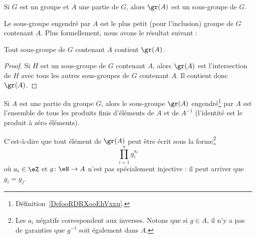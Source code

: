 \begin{lemma}
	Si \( G\) est un groupe et \( A\) une partie de \( G\), alors \( \gr(A)\) est un sous-groupe de \( G\).
\end{lemma}

Le sous-groupe engendré par \( A \) est le plus petit (pour l'inclusion) groupe de \( G\) contenant \( A\). Plus formellement, nous avons le résultat suivant :
\begin{lemma}
	Tout sous-groupe de \( G\) contenant \( A\) contient \( \gr(A)\).
\end{lemma}

\begin{proof}
	Si \( H\) est un sous-groupe de \( G\) contenant \( A\), alors \( \gr(A)\) est l'intersection de \( H\) avec tous les autres sous-groupes de \( G\) contenant \( A\). Il contient donc \( \gr(A)\).
\end{proof}

\begin{lemma}   \label{LemFUIZooBZTCiy}
	Si \( A\) est une partie du groupe \( G\), alors le sous-groupe \( \gr(A)\) engendré\footnote{Définition~\ref{DefooRDRXooEhVxxu}.} par \( A\) est l'ensemble de tous les produits finis d'éléments de \( A\) et de \( A^{-1}\) (l'identité est le produit à zéro éléments).

	C'est-à-dire que tout élément de \( \gr(A)\) peut être écrit sous la forme\footnote{Les \( a_i\) négatifs correspondent aux inverses. Notons que si \( g\in A\), il n'y a pas de garanties que \( g^{-1}\) soit également dans \( A\).}
	\begin{equation}
		\prod_{i=1}^ng_i^{a_i}
	\end{equation}
	où \( a_i\in \eZ\) et \( g\colon \eN\to A\) n'est pas spécialement injective : il peut arriver que \( g_i=g_j\).
\end{lemma}

